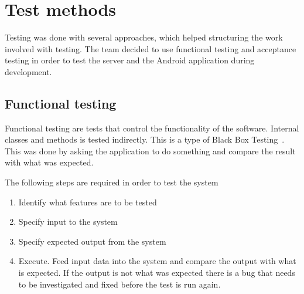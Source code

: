 \section{Test methods}
Testing was done with several approaches, which helped structuring the work involved with testing. The team decided to use functional testing and acceptance testing in order to test the server and the Android application during development.

\subsection{Functional testing}
Functional testing are tests that control the functionality of the software. Internal classes and methods is tested indirectly. This is a type of Black Box Testing~\cite{blackbox}.  This was done by asking the application to do something and compare the result with what was expected.

The following steps are required in order to test the system
\begin{enumerate}
\item Identify what features are to be tested
\item Specify input to the system
\item Specify expected output from the system
\item Execute. Feed input data into the system and compare the output with what is expected. If the output is not what was expected there is a bug that needs to be investigated and fixed before the test is run again.
\end{enumerate}

